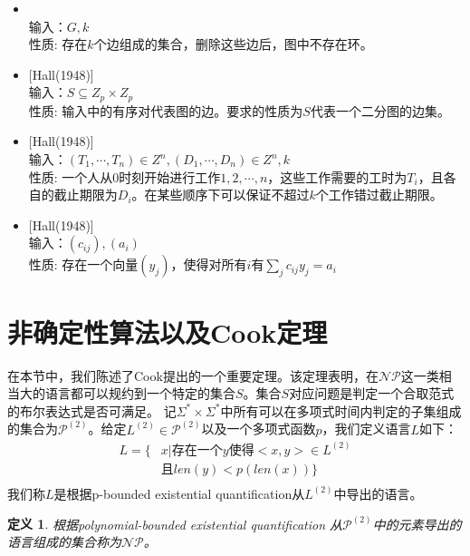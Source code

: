\documentclass[twocolumn]{article}
\newtheorem{definition}{\hspace{2em}定义}
\theoremstyle{nonumberplain}%
\begin{document}
\begin{CJK}{UTF8}{gbsn}
\begin{itemize}
    \item {}\\
    输入：$G, k$\\
    性质: 存在$k$个边组成的集合，删除这些边后，图中不存在环。

    \item {}[Hall(1948)]\\
    输入：$S\subseteq Z_p \times Z_p $\\
    性质: 输入中的有序对代表图的边。要求的性质为$S$代表一个二分图的边集。

    \item {}[Hall(1948)]\\
    输入：$(T_1,\cdots,T_n)\in Z^n, (D_1,\cdots,D_n)\in Z^n, k$\\
    性质: 一个人从0时刻开始进行工作$1,2,\cdots,n$，这些工作需要的工时为$T_i$，且各自的截止期限为$D_i$。在某些顺序下可以保证不超过$k$个工作错过截止期限。

    \item {}[Hall(1948)]\\
    输入：$(c_{ij}), (a_i)$\\
    性质: 存在一个向量$(y_j)$，使得对所有$i$有$\sum_j c_{ij}y_j = a_i$
    \end{itemize}

\section{非确定性算法以及Cook定理}
    在本节中，我们陈述了Cook提出的一个重要定理。该定理表明，在$\mathcal{NP}$这一类相当大的语言都可以规约到一个特定的集合$S$。集合$S$对应问题是判定一个合取范式的布尔表达式是否可满足。
    记$\Sigma^*\times\Sigma^*$中所有可以在多项式时间内判定的子集组成的集合为$\mathcal{P}^{(2)}$。给定$L^{(2)}\in \mathcal{P}^{(2)}$以及一个多项式函数$p$，我们定义语言$L$如下：
    \begin{equation}\nonumber
        \begin{aligned}
            L=\{&x|\text{存在一个}y\text{使得}<x,y>\in L^{(2)} \\
                &\text{且}len(y)<p(len(x))\} \\
        \end{aligned}
    \end{equation}
    我们称$L$是根据p-bounded existential quantification从$L^{(2)}$中导出的语言。

    \begin{definition}
        根据polynomial-bounded existential quantification 从$\mathcal{P}^{(2)}$中的元素导出的语言组成的集合称为$\mathcal{NP}$。
    \end{definition}


\end{CJK}
\end{document}
